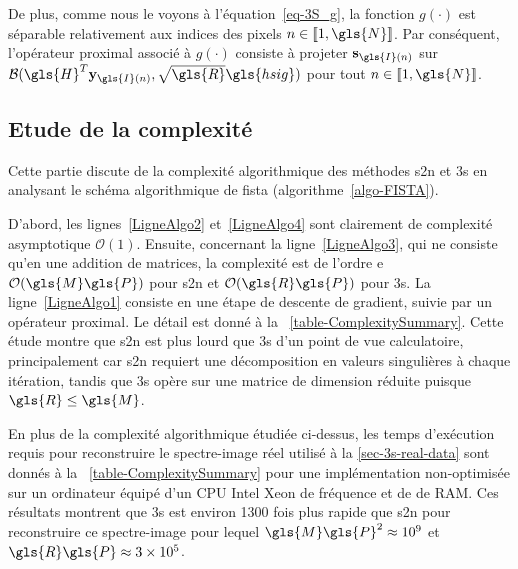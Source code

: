 De plus, comme nous le voyons à l'équation~\eqref{eq-3S_g}, la fonction $g(\cdot)$ est séparable relativement aux indices des pixels $n \in \llbracket 1,\gls{N}\rrbracket$. Par conséquent, l'opérateur proximal associé à $g(\cdot)$ consiste à projeter $\mathbf{s}_{\gls{I}(n)}$ sur $\mathcal{B}(\gls{H}^T\mathbf{y}_{\gls{I}(n)},\sqrt{\gls{R}}\gls{hsig})$ pour tout $n\in \llbracket 1,\gls{N}\rrbracket$.

\subsection{Etude de la complexité}

Cette partie discute de la complexité algorithmique des méthodes \gls{s2n} et \gls{3s} en analysant le schéma algorithmique de \gls{fista} (algorithme~\ref{algo-FISTA}).

D'abord, les lignes~\ref{LigneAlgo2} et~\ref{LigneAlgo4} sont clairement de complexité asymptotique $\mathcal{O}(1)$. Ensuite, concernant la ligne~\ref{LigneAlgo3}, qui ne consiste qu'en une addition de matrices, la complexité est de l'ordre e $\mathcal{O}(\gls{M}\gls{P})$ pour \gls{s2n} et $\mathcal{O}(\gls{R}\gls{P})$ pour \gls{3s}. La ligne~\ref{LigneAlgo1} consiste en une étape de descente de gradient, suivie par un opérateur proximal. Le détail est donné à la \tabname~\ref{table-ComplexitySummary}. Cette étude montre que \gls{s2n} est plus lourd que \gls{3s} d'un point de vue calculatoire, principalement car \gls{s2n} requiert une décomposition en valeurs singulières à chaque itération, tandis que \gls{3s} opère sur une matrice de dimension réduite puisque $\gls{R} \leq \gls{M}$.

En plus de la complexité algorithmique étudiée ci-dessus, les temps d'exécution requis pour reconstruire le spectre-image réel utilisé à la \cref{sec-3s-real-data} sont donnés à la \tabname~\ref{table-ComplexitySummary} pour une implémentation non-optimisée sur un ordinateur équipé d'un CPU Intel Xeon de fréquence  et de  de RAM. Ces résultats montrent que \gls{3s} est environ 1300 fois plus rapide que \gls{s2n} pour reconstruire ce spectre-image pour lequel $\gls{M}\gls{P}^2 \approx 10^9$ et $\gls{R}\gls{P} \approx 3\times 10^5$.

